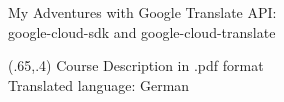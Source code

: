 \documentclass{beamer}
\begin{document}
\begin{frame}{My Adventures with Google Translate API:\\
google-cloud-sdk and google-cloud-translate}


\begin{textblock}{1}(.65,.4)
  \footnotesize  {Course Description in .pdf format \\
Translated language: German}
\end{textblock}

\end{frame}
\end{document}
